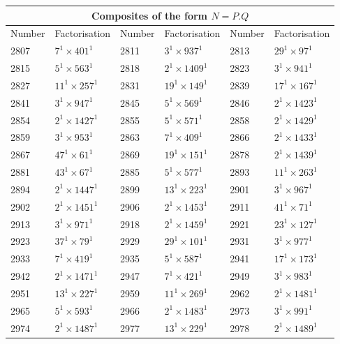 \documentclass[11pt,a4paper]{article}
\begin{document}
\begin{enumerate}[1.]
\begin{flushleft}
			\begin{table}[H]
				\begin{adjustbox}{scale=0.9,center}
			\begin{tabular}{ ||p{2cm}|p{2cm}||p{2cm}|p{2cm}||p{2cm}|p{2cm}|| }
				\hline
				\multicolumn{6}{|c|}{Composites of the form $N = P.Q$} \\
				\hline
				Number & Factorisation & Number & Factorisation & Number & Factorisation\\
				\hline
				2807 & $7^1 \times 401^1$ & 2811 & $3^1 \times 937^1$ & 2813 & $29^1 \times 97^1$ \\
				2815 & $5^1 \times 563^1$ & 2818 & $2^1 \times 1409^1$&2823  & $3^1 \times 941^1$ \\
				2827 & $11^1 \times 257^1$& 2831 & $19^1 \times 149^1$&2839  & $17^1 \times 167^1$\\
				2841 & $3^1 \times 947^1$&2845 & $5^1 \times 569^1$&2846 & $2^1 \times 1423^1$ \\
				2854 & $2^1 \times 1427^1$&2855 & $5^1 \times 571^1$&2858 & $2^1 \times 1429^1$\\
				2859 & $3^1 \times 953^1$&2863 & $7^1 \times 409^1$&2866 & $2^1 \times 1433^1$\\
				2867 & $47^1 \times 61^1$&2869 & $19^1 \times 151^1$&2878 & $2^1 \times 1439^1$\\
				2881 & $43^1 \times 67^1$&2885 & $5^1 \times 577^1$&2893 & $11^1 \times 263^1$\\
				2894 & $2^1 \times 1447^1$&2899 & $13^1 \times 223^1$&2901 & $3^1 \times 967^1$\\
				2902 & $2^1 \times 1451^1$&2906 & $2^1 \times 1453^1$&2911 & $41^1 \times 71^1$\\
				2913 & $3^1 \times 971^1$&2918 & $2^1 \times 1459^1$&2921 & $23^1 \times 127^1$\\
				2923 & $37^1 \times 79^1$&2929 & $29^1 \times 101^1$&2931 & $3^1 \times 977^1$\\
				2933 & $7^1 \times 419^1$&2935 & $5^1 \times 587^1$&2941 & $17^1 \times 173^1$\\
				2942 & $2^1 \times 1471^1$&2947 & $7^1 \times 421^1$&2949 & $3^1 \times 983^1$\\
				2951 & $13^1 \times 227^1$&2959 & $11^1 \times 269^1$&2962 & $2^1 \times 1481^1$\\
				2965 & $5^1 \times 593^1$&2966 & $2^1 \times 1483^1$&2973 & $3^1 \times 991^1$\\
				2974 & $2^1 \times 1487^1$&2977 & $13^1 \times 229^1$&2978 & $2^1 \times 1489^1$\\

\end{tabular}
\end{adjustbox}
\end{table}
\end{flushleft}
\end{enumerate}
\end{document}
